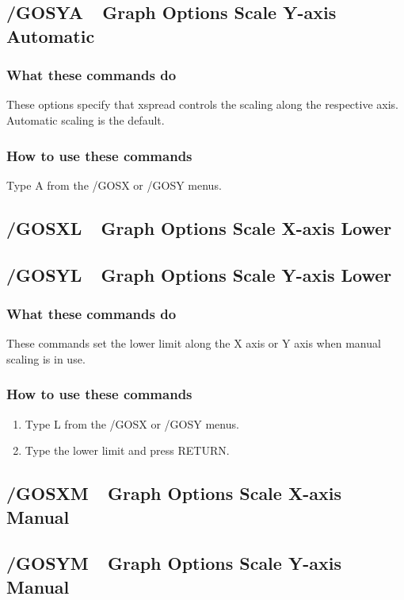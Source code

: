 \subsection*{/GOSYA\ \   Graph Options Scale Y-axis Automatic}

\subsubsection*{What these commands do}
These options specify that xspread controls the scaling along the 
respective axis.  Automatic scaling is the default.

\subsubsection*{How to use these commands}
Type A from the /GOSX or /GOSY menus.

\subsection*{/GOSXL\ \   Graph Options Scale X-axis Lower}
\subsection*{/GOSYL\ \   Graph Options Scale Y-axis Lower}

\subsubsection*{What these commands do}
These commands set the lower limit along the X axis or Y axis when 
manual scaling is in use.

\subsubsection*{How to use these commands}
\begin{enumerate}
\item{Type L from the /GOSX or /GOSY menus.}
\item{Type the lower limit and press RETURN.}
\end{enumerate}
 
\subsection*{/GOSXM\ \   Graph Options Scale X-axis Manual}
\subsection*{/GOSYM\ \   Graph Options Scale Y-axis Manual}

